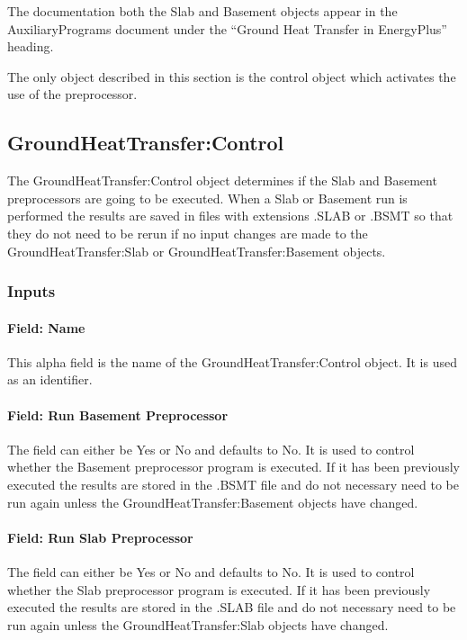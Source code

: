 The documentation both the Slab and Basement objects appear in the AuxiliaryPrograms document under the ``Ground Heat Transfer in EnergyPlus'' heading.

The only object described in this section is the control object which activates the use of the preprocessor.

\subsection{GroundHeatTransfer:Control}\label{groundheattransfercontrol}

The GroundHeatTransfer:Control object determines if the Slab and Basement preprocessors are going to be executed. When a Slab or Basement run is performed the results are saved in files with extensions .SLAB or .BSMT so that they do not need to be rerun if no input changes are made to the GroundHeatTransfer:Slab or GroundHeatTransfer:Basement objects.

\subsubsection{Inputs}\label{inputs-013}

\paragraph{Field: Name}\label{field-name-012}

This alpha field is the name of the GroundHeatTransfer:Control object. It is used as an identifier.

\paragraph{Field: Run Basement Preprocessor}\label{field-run-basement-preprocessor}

The field can either be Yes or No and defaults to No. It is used to control whether the Basement preprocessor program is executed. If it has been previously executed the results are stored in the .BSMT file and do not necessary need to be run again unless the GroundHeatTransfer:Basement objects have changed.

\paragraph{Field: Run Slab Preprocessor}\label{field-run-slab-preprocessor}

The field can either be Yes or No and defaults to No. It is used to control whether the Slab preprocessor program is executed. If it has been previously executed the results are stored in the .SLAB file and do not necessary need to be run again unless the GroundHeatTransfer:Slab objects have changed.
